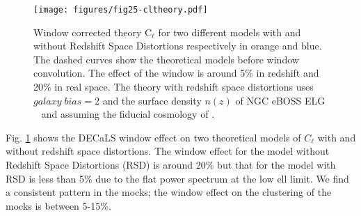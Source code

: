 \begin{figure}
    \centering
    \texttt{[image: figures/fig25-cltheory.pdf]}
    \caption{Window corrected theory C$_{\ell}$ for two different models with and without Redshift Space Distortions respectively in orange and blue. The dashed curves show the theoretical models before window convolution. The effect of the window is around 5\% in redshift and 20\% in real space. The theory with redshift space distortions uses $galaxy\;bias = 2$ and the surface density $n(z)$ of NGC eBOSS ELG ~\citep[Tab. 4 of][]{Raichoor2017MNRAS.471.3955R} and assuming the fiducial cosmology of \citet{ashley2012MNRAS,2012ApJ...761...14H}.}
    \label{fig:Cellwindowratio}
\end{figure}


Fig. \ref{fig:Cellwindowratio} shows the DECaLS window effect on two theoretical models of $C_{\ell}$ with and without redshift space distortions. The window effect for the model without Redshift Space Distortions (RSD) is around 20\% but that for the model with RSD is less than 5\% due to the flat power spectrum at the low ell limit. We find a consistent pattern in the mocks; the window effect on the clustering of the mocks is between 5-15\%.
